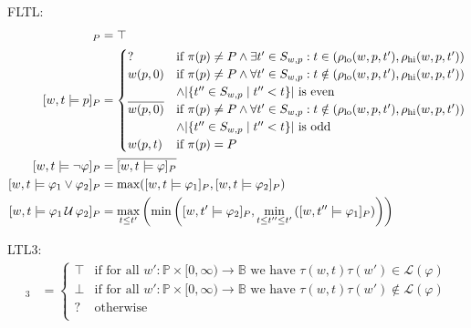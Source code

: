 \documentclass[envcountsame, runningheads]{llncs}
\newcommand{\B}{\mathbb{B}}
\def\until{\,\mathcal{U}\,}
\def\since{\,\mathcal{S}\,}
\newcommand{\?}{\text{?}}
\newcommand{\suchthat}{\;\ifnum\currentgrouptype=16 \middle\fi|\;}
\let\st\suchthat
\begin{document}
	\vspace{1em}
	FLTL:
	\begin{align*}
		[w,t \models \texttt{true}]_P &= \top \\
		[w,t \models p]_P &= \begin{cases}
			? &\text{if } \pi(p) \not = P \land \exists t' \in S_{w,p} : t \in (\rho_{\text{lo}}(w, p, t'), \rho_{\text{hi}}(w, p, t')) \\
			w(p,0) &\text{if } \pi(p) \not = P \land \forall t' \in S_{w,p} : t \notin (\rho_{\text{lo}}(w, p, t'), \rho_{\text{hi}}(w, p, t')) \\
			&\land |\{t'' \in S_{w,p} \st t'' < t\}| \text{ is even} \\
			\overline{w(p,0)} &\text{if } \pi(p) \not = P \land \forall t' \in S_{w,p} : t \notin (\rho_{\text{lo}}(w, p, t'), \rho_{\text{hi}}(w, p, t')) \\
			&\land |\{t'' \in S_{w,p} \st t'' < t\}| \text{ is odd} \\
			w(p,t) &\text{if } \pi(p) = P \\
		\end{cases} \\
		[w,t \models \lnot \varphi]_P &= \overline{[w,t \models \varphi]_P}\\
		[w,t \models \varphi_1 \lor \varphi_2]_P &= \max([w,t \models \varphi_1]_P, [w,t \models \varphi_2]_P)\\
		[w,t \models \varphi_1 \until \varphi_2]_P &= \max_{t \leq t'} \left( \min \left( [w,t' \models \varphi_2]_P, \min_{t \leq t'' \leq t'} \left( [w,t'' \models \varphi_1]_P \right) \right) \right)\\
	\end{align*}
	
	LTL3:
	\begin{align*}
		[w,t \models \varphi]_3 &= \begin{cases}
			\top &\text{if for all }  w' : \mathbb{P} \times [0, \infty) \to \B  \text{ we have } \tau(w,t) \tau(w') \in \mathcal{L}(\varphi)\\
			\bot &\text{if for all }  w' : \mathbb{P} \times [0, \infty) \to \B  \text{ we have } \tau(w,t) \tau(w') \notin \mathcal{L}(\varphi)\\
			? &\text{otherwise}\\
		\end{cases}
	\end{align*}
	
\end{document}
